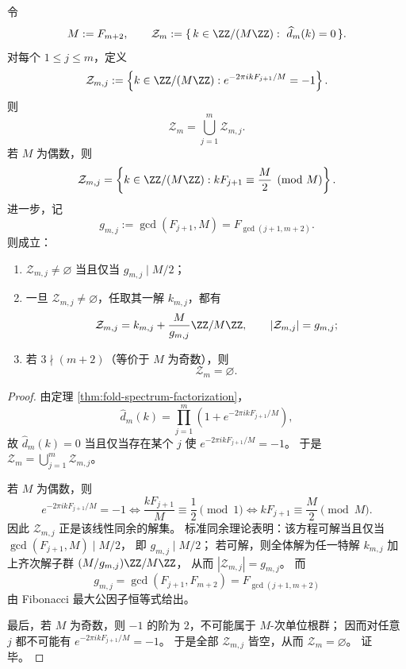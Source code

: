 \begin{theorem}[谱零点集合的同余与仿射陪集刻画]\label{thm:killo-fold-zero-spectrum-affine-congruence}
令
\[
M:=F_{m+2},
\qquad
\mathcal Z_m:=\{\,k\in \ZZ/(M\ZZ):\ \widehat d_m(k)=0\,\}.
\]
对每个 \(1\le j\le m\)，定义
\[
\mathcal Z_{m,j}
:=
\left\{
k\in \ZZ/(M\ZZ):
e^{-2\pi i kF_{j+1}/M}=-1
\right\}.
\]
则
\[
\mathcal Z_m=\bigcup_{j=1}^{m}\mathcal Z_{m,j}.
\]
若 \(M\) 为偶数，则
\[
\mathcal Z_{m,j}
=
\left\{
k\in \ZZ/(M\ZZ):
kF_{j+1}\equiv \frac{M}{2}\pmod M
\right\}.
\]
进一步，记
\[
g_{m,j}:=\gcd(F_{j+1},M)=F_{\gcd(j+1,m+2)}.
\]
则成立：
\begin{enumerate}
\normalfont
  \item \(\mathcal Z_{m,j}\neq\varnothing\) 当且仅当 \(g_{m,j}\mid M/2\)；
  \item 一旦 \(\mathcal Z_{m,j}\neq\varnothing\)，任取其一解 \(k_{m,j}\)，都有
  \[
  \mathcal Z_{m,j}
  =
  k_{m,j}+\frac{M}{g_{m,j}}\ZZ/M\ZZ,
  \qquad
  |\mathcal Z_{m,j}|=g_{m,j};
  \]
  \item 若 \(3\nmid (m+2)\)（等价于 \(M\) 为奇数），则
  \[
  \mathcal Z_m=\varnothing.
  \]
\end{enumerate}
\end{theorem}
\begin{proof}
由定理 \ref{thm:fold-spectrum-factorization}，
\[
\widehat d_m(k)=\prod_{j=1}^{m}\left(1+e^{-2\pi i kF_{j+1}/M}\right),
\]
故 \(\widehat d_m(k)=0\) 当且仅当存在某个 \(j\) 使
\(
e^{-2\pi i kF_{j+1}/M}=-1
\)。
于是
\(
\mathcal Z_m=\bigcup_{j=1}^{m}\mathcal Z_{m,j}
\)。

若 \(M\) 为偶数，则
\[
e^{-2\pi i kF_{j+1}/M}=-1
\iff
\frac{kF_{j+1}}{M}\equiv \frac12\pmod 1
\iff
kF_{j+1}\equiv \frac{M}{2}\pmod M.
\]
因此 \(\mathcal Z_{m,j}\) 正是该线性同余的解集。
标准同余理论表明：该方程可解当且仅当
\(
\gcd(F_{j+1},M)\mid M/2
\)，
即 \(g_{m,j}\mid M/2\)；
若可解，则全体解为任一特解 \(k_{m,j}\) 加上齐次解子群
\(
(M/g_{m,j})\ZZ/M\ZZ
\)，
从而
\(
|\mathcal Z_{m,j}|=g_{m,j}
\)。
而
\[
g_{m,j}
=
\gcd(F_{j+1},F_{m+2})
=
F_{\gcd(j+1,m+2)}
\]
由 Fibonacci 最大公因子恒等式给出。

最后，若 \(M\) 为奇数，则 \(-1\) 的阶为 \(2\)，不可能属于 \(M\)-次单位根群；
因而对任意 \(j\) 都不可能有
\(
e^{-2\pi i kF_{j+1}/M}=-1
\)。
于是全部 \(\mathcal Z_{m,j}\) 皆空，从而 \(\mathcal Z_m=\varnothing\)。
证毕。
\end{proof}

